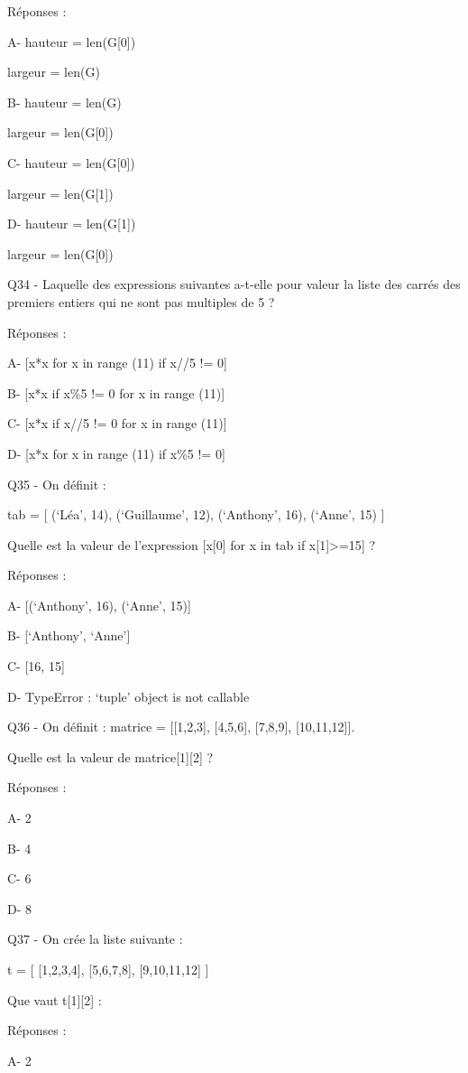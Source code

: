 \documentclass[
]{book}
\begin{document}
Réponses :

A- hauteur = len(G{[}0{]})

largeur = len(G)

B- hauteur = len(G)

largeur = len(G{[}0{]})

C- hauteur = len(G{[}0{]})

largeur = len(G{[}1{]})

D- hauteur = len(G{[}1{]})

largeur = len(G{[}0{]})

Q34 - Laquelle des expressions suivantes a-t-elle pour valeur la liste des carrés des premiers entiers qui ne sont pas multiples de 5 ?

Réponses :

A- {[}x*x for x in range (11) if x//5 != 0{]}

B- {[}x*x if x\%5 != 0 for x in range (11){]}

C- {[}x*x if x//5 != 0 for x in range (11){]}

D- {[}x*x for x in range (11) if x\%5 != 0{]}

Q35 - On définit :

tab = {[} (`Léa', 14), (`Guillaume', 12), (`Anthony', 16), (`Anne', 15) {]}

Quelle est la valeur de l'expression {[}x{[}0{]} for x in tab if x{[}1{]}\textgreater=15{]} ?

Réponses :

A- {[}(`Anthony', 16), (`Anne', 15){]}

B- {[}`Anthony', `Anne'{]}

C- {[}16, 15{]}

D- TypeError : `tuple' object is not callable

Q36 - On définit : matrice = {[}{[}1,2,3{]}, {[}4,5,6{]}, {[}7,8,9{]}, {[}10,11,12{]}{]}.

Quelle est la valeur de matrice{[}1{]}{[}2{]} ?

Réponses :

A- 2

B- 4

C- 6

D- 8

Q37 - On crée la liste suivante :

t = {[} {[}1,2,3,4{]}, {[}5,6,7,8{]}, {[}9,10,11,12{]} {]}

Que vaut t{[}1{]}{[}2{]} :

Réponses :

A- 2
\end{document}
